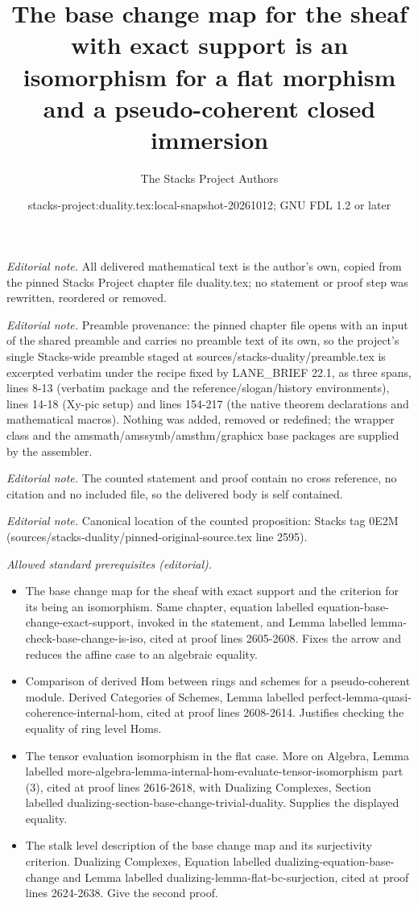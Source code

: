 \documentclass[10pt,a4paper]{amsart}
\title{The base change map for the sheaf with exact support is an isomorphism for a flat morphism and a pseudo-coherent closed immersion}
\author{The Stacks Project Authors}
\date{stacks-project:duality.tex:local-snapshot-20261012; GNU FDL 1.2 or later}
\theoremstyle{plain}
\theoremstyle{definition}
\theoremstyle{remark}
\numberwithin{equation}{subsection}
\begin{document}
\maketitle
\noindent\textit{Editorial note.} All delivered mathematical text is the author's own, copied from the pinned Stacks Project chapter file duality.tex; no statement or proof step was rewritten, reordered or removed.\par\medskip
\noindent\textit{Editorial note.} Preamble provenance: the pinned chapter file opens with an input of the shared preamble and carries no preamble text of its own, so the project's single Stacks-wide preamble staged at sources/stacks-duality/preamble.tex is excerpted verbatim under the recipe fixed by LANE\_BRIEF 22.1, as three spans, lines 8-13 (verbatim package and the reference/slogan/history environments), lines 14-18 (Xy-pic setup) and lines 154-217 (the native theorem declarations and mathematical macros). Nothing was added, removed or redefined; the wrapper class and the amsmath/amssymb/amsthm/graphicx base packages are supplied by the assembler.\par\medskip
\noindent\textit{Editorial note.} The counted statement and proof contain no cross reference, no citation and no included file, so the delivered body is self contained.\par\medskip
\noindent\textit{Editorial note.} Canonical location of the counted proposition: Stacks tag 0E2M (sources/stacks-duality/pinned-original-source.tex line 2595).\par\medskip
\noindent\textit{Allowed standard prerequisites (editorial).}\begin{itemize}
\item The base change map for the sheaf with exact support and the criterion for its being an isomorphism. Same chapter, equation labelled equation-base-change-exact-support, invoked in the statement, and Lemma labelled lemma-check-base-change-is-iso, cited at proof lines 2605-2608. Fixes the arrow and reduces the affine case to an algebraic equality.
\item Comparison of derived Hom between rings and schemes for a pseudo-coherent module. Derived Categories of Schemes, Lemma labelled perfect-lemma-quasi-coherence-internal-hom, cited at proof lines 2608-2614. Justifies checking the equality of ring level Homs.
\item The tensor evaluation isomorphism in the flat case. More on Algebra, Lemma labelled more-algebra-lemma-internal-hom-evaluate-tensor-isomorphism part (3), cited at proof lines 2616-2618, with Dualizing Complexes, Section labelled dualizing-section-base-change-trivial-duality. Supplies the displayed equality.
\item The stalk level description of the base change map and its surjectivity criterion. Dualizing Complexes, Equation labelled dualizing-equation-base-change and Lemma labelled dualizing-lemma-flat-bc-surjection, cited at proof lines 2624-2638. Give the second proof.
\end{itemize}\medskip
\end{document}
